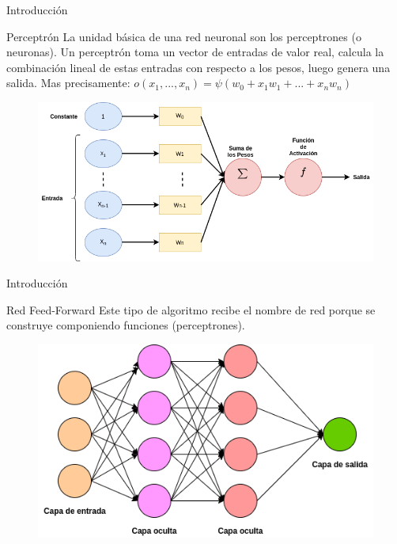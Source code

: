 \documentclass{beamer}
\begin{document}
\begin{frame}{Introducci\'on}

  \begin{block}{Perceptr\'on}
    La unidad b\'asica de una red neuronal son los perceptrones (o neuronas). Un
    perceptr\'on toma un vector de entradas de valor real, calcula la combinaci\'on
    lineal de estas entradas con respecto a los pesos, luego genera una salida. Mas precisamente:
    $o(x_1,...,x_n) = \psi(w_0+x_1w_1+...+x_nw_n)$
  \end{block}
    
  \begin{figure}
      \includegraphics[scale=0.35]{perceptron}
  \end{figure}
    
\end{frame}

\begin{frame}{Introducci\'on}

  \begin{block}{Red Feed-Forward}
    Este tipo de algoritmo recibe el nombre de red porque se construye componiendo funciones (perceptrones).
  \end{block}

  \begin{figure}
      \includegraphics[scale=0.5]{feedforward}
  \end{figure}
  
\end{frame}
\end{document}
